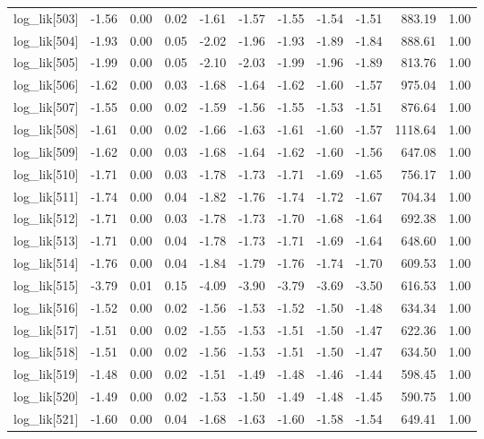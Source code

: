 \begin{table}[ht]
\begin{tabular}{rrrrrrrrrrr}
  log\_lik[503] & -1.56 & 0.00 & 0.02 & -1.61 & -1.57 & -1.55 & -1.54 & -1.51 & 883.19 & 1.00 \\ 
  log\_lik[504] & -1.93 & 0.00 & 0.05 & -2.02 & -1.96 & -1.93 & -1.89 & -1.84 & 888.61 & 1.00 \\ 
  log\_lik[505] & -1.99 & 0.00 & 0.05 & -2.10 & -2.03 & -1.99 & -1.96 & -1.89 & 813.76 & 1.00 \\ 
  log\_lik[506] & -1.62 & 0.00 & 0.03 & -1.68 & -1.64 & -1.62 & -1.60 & -1.57 & 975.04 & 1.00 \\ 
  log\_lik[507] & -1.55 & 0.00 & 0.02 & -1.59 & -1.56 & -1.55 & -1.53 & -1.51 & 876.64 & 1.00 \\ 
  log\_lik[508] & -1.61 & 0.00 & 0.02 & -1.66 & -1.63 & -1.61 & -1.60 & -1.57 & 1118.64 & 1.00 \\ 
  log\_lik[509] & -1.62 & 0.00 & 0.03 & -1.68 & -1.64 & -1.62 & -1.60 & -1.56 & 647.08 & 1.00 \\ 
  log\_lik[510] & -1.71 & 0.00 & 0.03 & -1.78 & -1.73 & -1.71 & -1.69 & -1.65 & 756.17 & 1.00 \\ 
  log\_lik[511] & -1.74 & 0.00 & 0.04 & -1.82 & -1.76 & -1.74 & -1.72 & -1.67 & 704.34 & 1.00 \\ 
  log\_lik[512] & -1.71 & 0.00 & 0.03 & -1.78 & -1.73 & -1.70 & -1.68 & -1.64 & 692.38 & 1.00 \\ 
  log\_lik[513] & -1.71 & 0.00 & 0.04 & -1.78 & -1.73 & -1.71 & -1.69 & -1.64 & 648.60 & 1.00 \\ 
  log\_lik[514] & -1.76 & 0.00 & 0.04 & -1.84 & -1.79 & -1.76 & -1.74 & -1.70 & 609.53 & 1.00 \\ 
  log\_lik[515] & -3.79 & 0.01 & 0.15 & -4.09 & -3.90 & -3.79 & -3.69 & -3.50 & 616.53 & 1.00 \\ 
  log\_lik[516] & -1.52 & 0.00 & 0.02 & -1.56 & -1.53 & -1.52 & -1.50 & -1.48 & 634.34 & 1.00 \\ 
  log\_lik[517] & -1.51 & 0.00 & 0.02 & -1.55 & -1.53 & -1.51 & -1.50 & -1.47 & 622.36 & 1.00 \\ 
  log\_lik[518] & -1.51 & 0.00 & 0.02 & -1.56 & -1.53 & -1.51 & -1.50 & -1.47 & 634.50 & 1.00 \\ 
  log\_lik[519] & -1.48 & 0.00 & 0.02 & -1.51 & -1.49 & -1.48 & -1.46 & -1.44 & 598.45 & 1.00 \\ 
  log\_lik[520] & -1.49 & 0.00 & 0.02 & -1.53 & -1.50 & -1.49 & -1.48 & -1.45 & 590.75 & 1.00 \\ 
  log\_lik[521] & -1.60 & 0.00 & 0.04 & -1.68 & -1.63 & -1.60 & -1.58 & -1.54 & 649.41 & 1.00 \\ 

\end{tabular}
\end{table}
